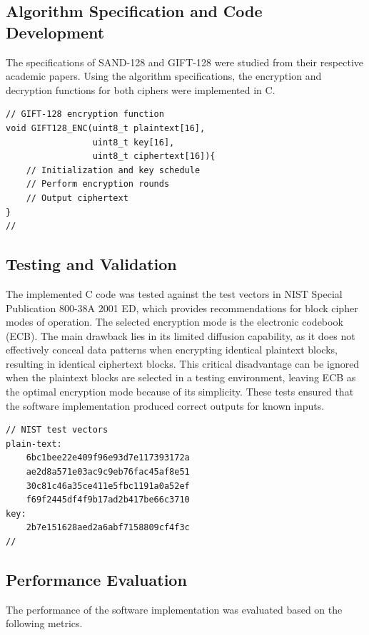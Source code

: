 \documentclass[conference]{IEEEtran}
\begin{document}
\subsection{Algorithm Specification and Code Development}

The specifications of SAND-128 and GIFT-128 were studied from their respective academic papers. Using the algorithm specifications, the encryption and decryption functions for both ciphers were implemented in C.

\begin{verbatim}
// GIFT-128 encryption function
void GIFT128_ENC(uint8_t plaintext[16],
                 uint8_t key[16],
                 uint8_t ciphertext[16]){
    // Initialization and key schedule
    // Perform encryption rounds
    // Output ciphertext
}
//
\end{verbatim}

\subsection{Testing and Validation}

The implemented C code was tested against the test vectors in NIST Special Publication 800-38A 2001 ED\cite{dworkin2001recommendation}, which provides recommendations for block cipher modes of operation. The selected encryption mode is the electronic codebook (ECB). The main drawback lies in its limited diffusion capability, as it does not effectively conceal data patterns when encrypting identical plaintext blocks, resulting in identical ciphertext blocks. This critical disadvantage can be ignored when the plaintext blocks are selected in a testing environment, leaving ECB as the optimal encryption mode because of its simplicity. These tests ensured that the software implementation produced correct outputs for known inputs.

\begin{verbatim}
// NIST test vectors
plain-text:
    6bc1bee22e409f96e93d7e117393172a
    ae2d8a571e03ac9c9eb76fac45af8e51
    30c81c46a35ce411e5fbc1191a0a52ef
    f69f2445df4f9b17ad2b417be66c3710
key:
    2b7e151628aed2a6abf7158809cf4f3c
//
\end{verbatim}

\subsection{Performance Evaluation}

The performance of the software implementation was evaluated based on the following metrics.
\end{document}
